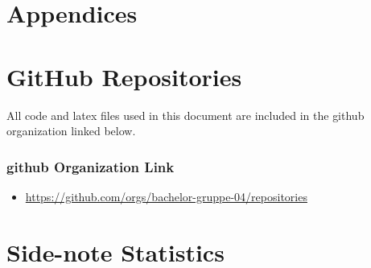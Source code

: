 \chapter*{\LARGE Appendices}

\appendix

\chapter{GitHub Repositories}

All code and \gls{latex} files used in this document are included in the \gls{github} organization linked below.

\subsection*{\gls{github} Organization Link}

\begin{itemize}
    \item \url{https://github.com/orgs/bachelor-gruppe-04/repositories}
\end{itemize}

\chapter{Side-note Statistics}

